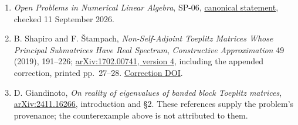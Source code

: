 \documentclass[10pt,a4paper]{article}
\providecommand{\tightlist}{\setlength{\itemsep}{0pt}\setlength{\parskip}{0pt}}
\begin{document}
\begin{enumerate}
\def\labelenumi{\arabic{enumi}.}
\tightlist
\item
  \emph{Open Problems in Numerical Linear Algebra}, SP-06,
  \href{https://github.com/ajt60gaibb/OpenProblemsInNLA/blob/main/eigenvalues-and-inverse-problems/SP-06/README.md}{canonical
  statement}, checked 11 September 2026.
\item
  B. Shapiro and F. Štampach, \emph{Non-Self-Adjoint Toeplitz Matrices
  Whose Principal Submatrices Have Real Spectrum}, \emph{Constructive
  Approximation} 49 (2019), 191--226;
  \href{https://arxiv.org/abs/1702.00741v4}{arXiv:1702.00741, version
  4}, including the appended correction, printed pp.~27--28.
  \href{https://doi.org/10.1007/s00365-022-09614-0}{Correction DOI}.
\item
  D. Giandinoto, \emph{On reality of eigenvalues of banded block
  Toeplitz matrices},
  \href{https://arxiv.org/abs/2411.16266}{arXiv:2411.16266},
  introduction and §2. These references supply the problem's provenance;
  the counterexample above is not attributed to them.
\end{enumerate}
\end{document}
